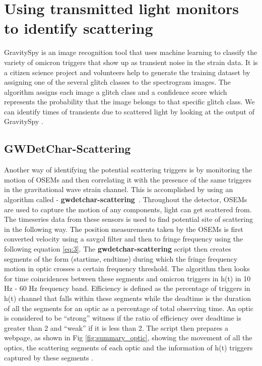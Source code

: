 \documentclass[12pt]{iopart}
\begin{document}
\par 

\vspace{0.5cm}
 
\section{Using transmitted light monitors to identify scattering}\label{transmonwitness}
GravitySpy is an image recognition tool that uses machine learning to classify the variety of omicron triggers that show up as transient noise in the strain data.  It is a citizen science project and volunteers help to generate the training dataset by assigning one of the several glitch classes to the spectrogram images. The algorithm assigns each image a glitch class and a confidence score which represents the probability that the image belongs to that specific glitch class.
We can identify times of transients due to scattered light by looking at the output of GravitySpy \cite{Zevin_2017,gspymachine}.

\subsection{GWDetChar-Scattering}
Another way of identifying the potential scattering triggers is by monitoring the motion of OSEMs and then correlating it with the presence of the same triggers in the gravitational wave strain channel. This is accomplished by using an algorithm called - \textbf{gwdetchar-scattering}~\cite{gwdetchar}.  Throughout the detector, OSEMs are used to capture the motion of any components, light can get scattered from. The timeseries data from these sensors is used to find potential site of scattering in the following way. The position measurements taken by the OSEMs is first converted velocity using a savgol filter \cite{2020SciPy} and then to fringe frequency using the following equation \ref{eq:3}.
The \textbf{gwdetchar-scattering} script then creates segments of the form (startime, endtime) during which the fringe frequency motion in optic crosses a certain frequency threshold. The algorithm then looks for time coincidences between these segments and omicron triggers in h(t) in 10 Hz - 60 Hz frequency band. Efficiency is defined as the percentage of triggers in h(t) channel that falls within these segments while the deadtime is the duration of all the segments for an optic as a percentage of total observing time. An optic is considered to be ``strong'' witness if the ratio of efficiency over deadtime is greater than 2 and ``weak'' if it is less than 2. The script then prepares a webpage, as shown in Fig \ref{fig:summary_optic}, showing the movement of all the optics, the scattering segments of each optic and the information of h(t) triggers captured by these segments \cite{ligo_summary}.  
\end{document}
